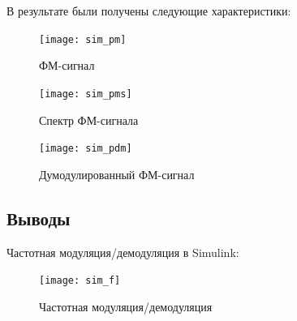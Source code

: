 \documentclass[10pt,a4paper]{article}
\begin{document}
В результате были получены следующие характеристики:
\begin{figure}[h]\centering
  \parbox[b]{0.49\textwidth}{\centering
    \texttt{[image: sim\_pm]} 
    \caption{ФМ-сигнал}\label{fig.sim_pm}}
  \hfil\hfil 
  \begin{minipage}[b]{0.49\textwidth}
	\centering
	\texttt{[image: sim\_pms]}
	\caption{Спектр ФМ-сигнала}\label{fig.sim_pms} 
  \end{minipage}
\end{figure}

\begin{figure}[h]\centering
    \texttt{[image: sim\_pdm]} 
    \caption{Думодулированный ФМ-сигнал}\label{fig.sim_pdm}
\end{figure}
\FloatBarrier
\subsection{Выводы}

Частотная модуляция/демодуляция в Simulink:
\begin{figure}[h]\centering
    \texttt{[image: sim\_f]} 
    \caption{Частотная модуляция/демодуляция}\label{fig.sim_f}
\end{figure}                                                                                                                                                                                                                                                                                                                                                                                                                                                                                                                                                                                                                                                                                                                                                                                                                                                                                                                                                                                                                                                                                                                                                                                                                                                                                                                                                                                                                                                                       
\end{document}
